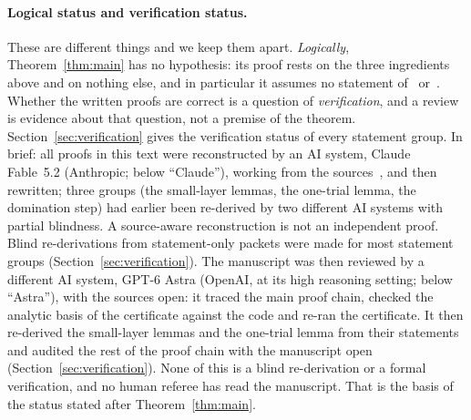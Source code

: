 \documentclass[11pt]{article}
\theoremstyle{definition}
\begin{document}
\paragraph{Logical status and verification status.} These are different things and we keep them apart.
\emph{Logically}, Theorem~\ref{thm:main} has no hypothesis: its proof rests on the three ingredients above and on
nothing else, and in particular it assumes no statement of~\cite{OAI} or~\cite{Base}. Whether the written proofs
are correct is a question of \emph{verification}, and a review is evidence about that question, not a premise of
the theorem. Section~\ref{sec:verification} gives the verification status of every statement group. In brief: all
proofs in this text were reconstructed by an AI system, Claude Fable~5.2 (Anthropic; below ``Claude''), working from
the sources~\cite{OAI,Base}, and then
rewritten; three groups (the small-layer lemmas, the one-trial lemma, the domination step) had earlier been
re-derived by two different AI systems with partial blindness. A source-aware reconstruction is not an independent
proof. Blind re-derivations from statement-only
packets were made for most statement groups (Section~\ref{sec:verification}). The manuscript was then reviewed by a different AI system, GPT-6
Astra (OpenAI, at its high reasoning setting; below ``Astra''), with the sources open: it traced the main proof chain, checked the analytic basis of the certificate
against the code and re-ran the certificate. It then re-derived the small-layer lemmas and the one-trial lemma
from their statements and audited the rest of the proof chain with the manuscript open
(Section~\ref{sec:verification}). None of this is a blind re-derivation or a formal verification, and no human referee
has read the manuscript. That is the basis of the status stated after Theorem~\ref{thm:main}.
\end{document}
